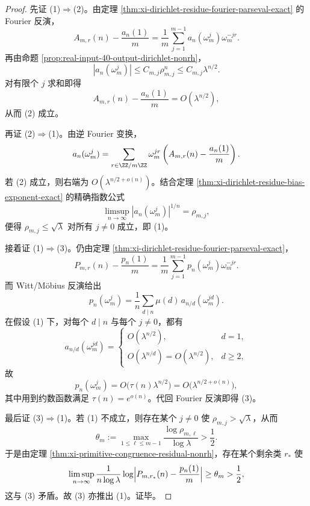 \begin{proof}
先证 (1)\(\Rightarrow\)(2)。由定理 \ref{thm:xi-dirichlet-residue-fourier-parseval-exact} 的 Fourier 反演，
\[
A_{m,r}(n)-\frac{a_n(1)}{m}
=
\frac1m\sum_{j=1}^{m-1}a_n(\omega_m^j)\omega_m^{-jr}.
\]
再由命题 \ref{prop:real-input-40-output-dirichlet-nonrh}，
\[
|a_n(\omega_m^j)|\le C_{m,j}\rho_{m,j}^n\le C_{m,j}\lambda^{n/2}.
\]
对有限个 \(j\) 求和即得
\[
A_{m,r}(n)-\frac{a_n(1)}{m}=O(\lambda^{n/2}),
\]
从而 (2) 成立。

再证 (2)\(\Rightarrow\)(1)。由逆 Fourier 变换，
\[
a_n(\omega_m^j)
=
\sum_{r\in\ZZ/m\ZZ}\omega_m^{jr}
\left(A_{m,r}(n)-\frac{a_n(1)}{m}\right).
\]
若 (2) 成立，则右端为 \(O(\lambda^{n/2+o(n)})\)。结合定理 \ref{thm:xi-dirichlet-residue-bias-exponent-exact} 的精确指数公式
\[
\limsup_{n\to\infty}|a_n(\omega_m^j)|^{1/n}=\rho_{m,j},
\]
便得 \(\rho_{m,j}\le \sqrt{\lambda}\) 对所有 \(j\neq 0\) 成立，即 (1)。

接着证 (1)\(\Rightarrow\)(3)。仍由定理 \ref{thm:xi-dirichlet-residue-fourier-parseval-exact}，
\[
P_{m,r}(n)-\frac{p_n(1)}{m}
=
\frac1m\sum_{j=1}^{m-1}p_n(\omega_m^j)\omega_m^{-jr}.
\]
而 Witt/M\"obius 反演给出
\[
p_n(\omega_m^j)
=
\frac1n\sum_{d\mid n}\mu(d)\,a_{n/d}(\omega_m^{jd}).
\]
在假设 (1) 下，对每个 \(d\mid n\) 与每个 \(j\neq 0\)，都有
\[
a_{n/d}(\omega_m^{jd})=
\begin{cases}
O(\lambda^{n/2}),& d=1,\\[2pt]
O(\lambda^{n/d})=O(\lambda^{n/2}),& d\ge 2,
\end{cases}
\]
故
\[
p_n(\omega_m^j)=O\!\bigl(\tau(n)\lambda^{n/2}\bigr)=O\!\bigl(\lambda^{n/2+o(n)}\bigr),
\]
其中用到约数函数满足 \(\tau(n)=e^{o(n)}\)。代回 Fourier 反演即得 (3)。

最后证 (3)\(\Rightarrow\)(1)。若 (1) 不成立，则存在某个 \(j\neq 0\) 使 \(\rho_{m,j}>\sqrt{\lambda}\)，从而
\[
\theta_m:=\max_{1\le \ell\le m-1}\frac{\log\rho_{m,\ell}}{\log\lambda}>\frac12.
\]
于是由定理 \ref{thm:xi-primitive-congruence-residual-nonrh}，存在某个剩余类 \(r_\ast\) 使
\[
\limsup_{n\to\infty}
\frac{1}{n\log\lambda}
\log\Bigl|P_{m,r_\ast}(n)-\frac{p_n(1)}{m}\Bigr|
\ge \theta_m>\frac12,
\]
这与 (3) 矛盾。故 (3) 亦推出 (1)。证毕。
\end{proof}

